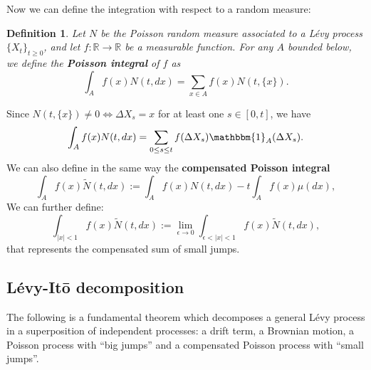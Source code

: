 \documentclass[a4paper,10pt]{article}
\newcommand{\numberset}{\mathbb}
\newcommand{\R}{\numberset{R}}
\newtheorem{Definition}{Definition}[section]
\begin{document}
\noindent
Now we can define the integration with respect to a random measure:
\begin{Definition} \label{Poisson_int}
 Let $N$ be the Poisson random measure associated to a Lévy process $\{X_t\}_{t \geq 0}$, and let $f:\R \to \R$ be a measurable
 function. For any $A$ bounded below, we define the \textbf{Poisson integral} of $f$ as
 \begin{equation}
  \int_A f(x) N(t,dx) = \sum_{x\in A} f(x) N(t,\{x\}). 
 \end{equation}
\end{Definition}
\noindent
Since $N(t,\{x\}) \neq 0 \Leftrightarrow \Delta X_s=x$ for at least one $s\in [0,t]$, we have  
 \begin{equation}
  \int_A f(x) N(t,dx) = \sum_{0 \leq s \leq t} f(\Delta X_s) \mathbbm{1}_A(\Delta X_s). 
 \end{equation}
We can also define in the same way the \textbf{compensated Poisson integral}
\begin{equation}
  \int_A f(x) \tilde{N}(t,dx) := \int_A f(x) N(t,dx) - t \int_A f(x) \mu(dx), 
\end{equation}
We can further define:
\begin{equation}
\int_{|x|<1} f(x) \tilde N(t,dx) := \lim_{\epsilon \to 0} \int_{\epsilon < |x| < 1} f(x) \tilde N(t,dx), 
\end{equation}
that represents the compensated sum of small jumps.

 
\subsection{Lévy-It\={o} decomposition} \label{LevyIto_sec}

The following is a fundamental theorem which decomposes a general Lévy process in a superposition 
of independent processes: a drift term, a Brownian motion, a Poisson process with ``big jumps'' and a compensated Poisson process with ``small jumps''.
\end{document}
